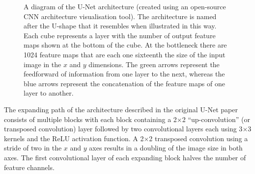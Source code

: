 \begin{figure}[!t]
    \centering
    
    \caption[A diagram of the U-Net architecture (created using an open-source CNN architecture visualisation tool). The architecture is named after the U-shape that it resembles when illustrated in this way. Each cube represents a layer with the number of output feature maps shown at the bottom of the cube. At the bottleneck there are 1024 feature maps that are each one sixteenth the size of the input image in the $x$ and $y$ dimensions. The green arrows represent the feedforward of information from one layer to the next, whereas the blue arrows represent the concatenation of the feature maps of one layer to another.]{A diagram of the U-Net architecture (created using an open-source CNN architecture visualisation tool\footnotemark). The architecture is named after the U-shape that it resembles when illustrated in this way. Each cube represents a layer with the number of output feature maps shown at the bottom of the cube. At the bottleneck there are 1024 feature maps that are each one sixteenth the size of the input image in the $x$ and $y$ dimensions. The green arrows represent the feedforward of information from one layer to the next, whereas the blue arrows represent the concatenation of the feature maps of one layer to another.}
    \label{fig:unetushape}
\end{figure}


The expanding path of the architecture described in the original U-Net paper consists of multiple blocks with each block containing a 2$\times$2 ``up-convolution'' (or transposed convolution) layer followed by two convolutional layers each using 3$\times$3 kernels and the ReLU activation function. A 2$\times$2 transposed convolution using a stride of two in the $x$ and $y$ axes results in a doubling of the image size in both axes. The first convolutional layer of each expanding block halves the number of feature channels.

